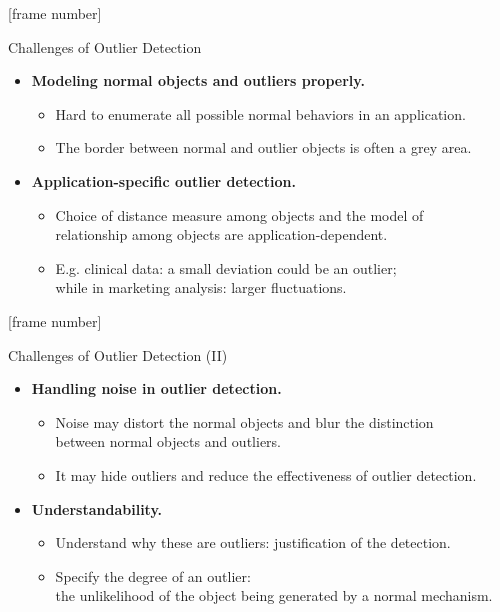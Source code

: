 \documentclass[aspectratio=169,t,xcolor=dvipsnames]{beamer}
\begin{document}
{
[frame number]
\begin{frame}{Challenges of Outlier Detection}
\begin{itemize}
    \item \textbf{Modeling normal objects and outliers properly.}
    \begin{itemize}
        \item Hard to enumerate all possible normal behaviors in an application.
        \item The border between normal and outlier objects is often a grey area.
    \end{itemize}
    \item \textbf{Application-specific outlier detection.}
    \begin{itemize}
        \item Choice of distance measure among objects and the model of \\
        relationship among objects are application-dependent.
        \item E.g. clinical data: a small deviation could be an outlier; \\
        while in marketing analysis: larger fluctuations.
    \end{itemize}
\end{itemize}
\end{frame}
}

{
[frame number]
\begin{frame}{Challenges of Outlier Detection (II)}
\begin{itemize}
    \item \textbf{Handling noise in outlier detection.}
    \begin{itemize}
        \item Noise may distort the normal objects and blur the distinction \\
         between normal objects and outliers.
        \item It may hide outliers and reduce the effectiveness of outlier detection.
    \end{itemize}
    \item \textbf{Understandability.}
    \begin{itemize}
        \item Understand why these are outliers: justification of the detection.
        \item Specify the degree of an outlier: \\
        the unlikelihood of the object being generated by a normal mechanism.
    \end{itemize}
\end{itemize}
\end{frame}
}
\end{document}
